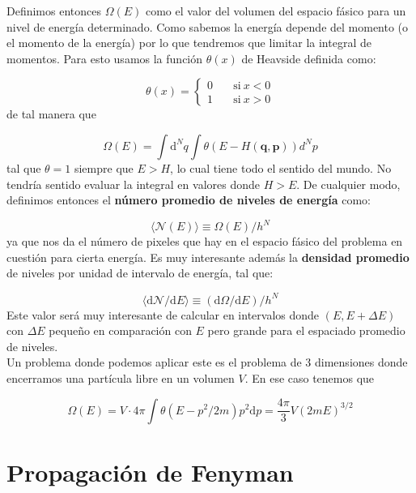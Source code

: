 \documentclass[12pt,a4paper]{article}
\numberwithin{equation}{section}
\numberwithin{figure}{section}
\newcommand{\parentesis}[1]{\left( #1  \right)}
\newcommand{\D}{\mathrm{d}}
\newcommand{\pn}{\mathbf{p}}
\newcommand{\qn}{\mathbf{q}}
\begin{document}
Definimos entonces $\Omega (E)$ como el valor del volumen del espacio fásico para un nivel de energía determinado. Como sabemos la energía depende del momento (o el momento de la energía) por lo que tendremos que limitar la integral de momentos. Para esto usamos la función $\theta(x)$ de Heavside definida como:

\begin{equation}
\theta (x) = \left\lbrace \begin{array}{ll}
0 & \quad \mathrm{si} \ x<0 \\
1 & \quad \mathrm{si} \ x>0 
\end{array} \right.
\end{equation}
de tal manera que

\begin{equation}
\Omega (E) = \int \D^N q \int \theta (E-H(\qn,\pn)) d^N p
\end{equation}
tal que $\theta = 1$ siempre que $E>H$, lo cual tiene todo el sentido del mundo. No tendría sentido evaluar la integral en valores donde $H>E$. De cualquier modo, definimos entonces el \textbf{número promedio de niveles de energía} como:

\begin{equation}
\langle \mathcal{N} (E) \rangle \equiv \Omega (E) / h^N
\end{equation}
ya que nos da el número de pixeles que hay en el espacio fásico del problema en cuestión para cierta energía. Es muy interesante además la \textbf{densidad promedio} de niveles por unidad de intervalo de energía, tal que:

\begin{equation}
\langle \D  \mathcal{N} / \D E \rangle \equiv (\D  \Omega / \D E) / h^N
\end{equation}
Este valor será muy interesante de calcular en intervalos donde $(E,E + \Delta E)$ con $\Delta E$ pequeño en comparación con $E$ pero grande para el espaciado promedio de niveles. \\

Un problema donde podemos aplicar este es el problema de 3 dimensiones donde encerramos una partícula libre en un volumen $V$. En ese caso tenemos que 

$$ \Omega(E) = V \cdot 4 \pi \int \theta(E - p^2/2m) p^2 \D p = \dfrac{4 \pi}{3}  V \parentesis{2mE}^{3/2}  $$

\newpage


\section{Propagación de Fenyman}
\end{document}

